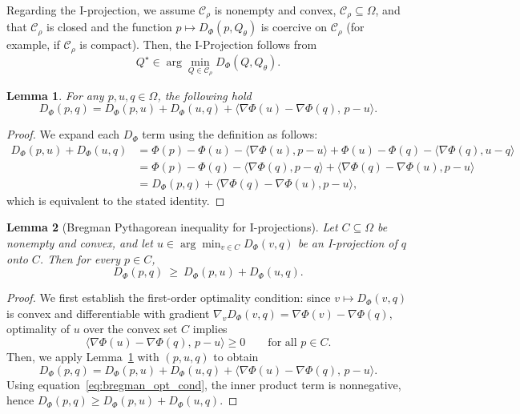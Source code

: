 \documentclass{article}
\newtheorem{lemma}{Lemma}
\theoremstyle{plain}
\theoremstyle{definition}
\def\eqref#1{equation~\ref{#1}}
\begin{document}
\begin{appendices}
Regarding the I-projection,
we assume $\mathcal{C}_\rho$ is nonempty and convex, $\mathcal{C}_\rho\subseteq \Omega$,
and that $\mathcal{C}_\rho$ is closed and the function $p\mapsto D_\Phi(p,Q_\theta)$ is coercive on
$\mathcal{C}_\rho$ (for example, if $\mathcal{C}_\rho$ is compact).
Then, the I-Projection follows from
\[
Q^\star\in\arg\min_{Q\in\mathcal{C}_\rho}D_\Phi(Q,Q_\theta).
\]

\begin{lemma}
\label{lem:three_point}
For any $p,u,q\in\Omega$,  the following hold
\[
D_\Phi(p,q)=D_\Phi(p,u)+D_\Phi(u,q)+\langle \nabla\Phi(u)-\nabla\Phi(q),\,p-u\rangle.
\]
\end{lemma}

\begin{proof}
We expand each $D_\Phi$ term using the definition as follows:
\begin{align*}
D_\Phi(p,u)+D_\Phi(u,q)
&=\Phi(p)-\Phi(u)-\langle\nabla\Phi(u),p-u\rangle
+\Phi(u)-\Phi(q)-\langle\nabla\Phi(q),u-q\rangle\\
&=\Phi(p)-\Phi(q)-\langle\nabla\Phi(q),p-q\rangle
+\langle\nabla\Phi(q)-\nabla\Phi(u),p-u\rangle\\
&=D_\Phi(p,q)+\langle\nabla\Phi(q)-\nabla\Phi(u),p-u\rangle,
\end{align*}
which is equivalent to the stated identity.
\end{proof}

\begin{lemma}[Bregman Pythagorean inequality for I-projections]
\label{lem:bregman_pythag}
Let $C\subseteq\Omega$ be nonempty and convex, and let
$u\in\arg\min_{v\in C}D_\Phi(v,q)$ be an I-projection of $q$ onto $C$.
Then for every $p\in C$,
\[
D_\Phi(p,q)\ \ge\ D_\Phi(p,u)+D_\Phi(u,q).
\]
\end{lemma}

\begin{proof}
We first establish the first-order optimality condition:
since $v\mapsto D_\Phi(v,q)$ is convex and differentiable with gradient
$\nabla_v D_\Phi(v,q)=\nabla\Phi(v)-\nabla\Phi(q)$,
optimality of $u$ over the convex set $C$ implies
\begin{equation}
\label{eq:bregman_opt_cond}
\langle \nabla\Phi(u)-\nabla\Phi(q),\,p-u\rangle \ge 0
\qquad\text{for all }p\in C.
\end{equation}
Then, we apply Lemma~\ref{lem:three_point} with $(p,u,q)$ to obtain
\[
D_\Phi(p,q)=D_\Phi(p,u)+D_\Phi(u,q)+\langle \nabla\Phi(u)-\nabla\Phi(q),\,p-u\rangle.
\]
Using \eqref{eq:bregman_opt_cond}, the inner product term is nonnegative, hence
$D_\Phi(p,q)\ge D_\Phi(p,u)+D_\Phi(u,q)$.
\end{proof}


\end{appendices}
\end{document}
